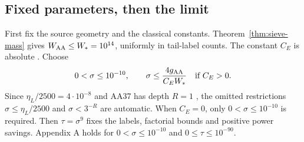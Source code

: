 \subsection{Fixed parameters, then the limit}

First fix the source geometry and the classical constants.
Theorem~\ref{thm:sieve-mass} gives $W_{\rm AA}\le W_*=10^{14}$,
uniformly in tail-label counts.
The constant $C_E$ is absolute \cite[Theorem~2.6, (2.31)]{Z1}.
Choose
\[
0<\sigma\le10^{-10},\qquad
\sigma\le\frac{4g_{\rm AA}}{C_EW_*}\quad\text{if }C_E>0.
\]
Since $\eta_L/2500=4\cdot10^{-8}$ and AA37 has depth $R=1$
\cite[Theorem~2.6]{Z1}, the omitted restrictions
$\sigma\le\eta_L/2500$ and $\sigma<3^{-R}$ are automatic.
When $C_E=0$, only $0<\sigma\le10^{-10}$ is required.
Then $\tau=\sigma^9$ fixes the labels, factorial bounds and positive power savings.
Appendix A holds for $0<\sigma\le10^{-10}$ and $0\le\tau\le10^{-90}$.

